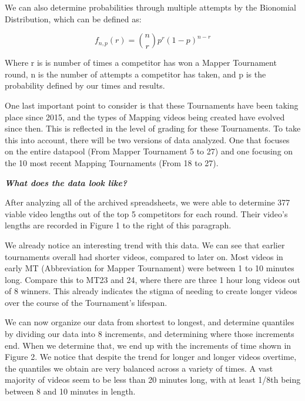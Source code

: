 \documentclass[letterpaper,twocolumn,amsmath,amssymb,prl,nolongbibliography,url,reprint]{revtex4-2}
\begin{document}
We can also determine probabilities through multiple attempts by the Bionomial Distribution, which can be defined as:

\begin{equation}
f_{n,p}(r) = \binom{n}{r} p^r (1-p)^{n-r}
\end{equation}

Where r is is number of times a competitor has won a Mapper Tournament round, n is the number of attempts a competitor has taken, and p is the probability defined by our times and results. 

One last important point to consider is that these Tournaments have been taking place since 2015, and the types of Mapping videos being created have evolved since then. This is reflected in the level of grading for these Tournaments. To take this into account, there will be two versions of data analyzed. One that focuses on the entire datapool (From Mapper Tournament 5 to 27) and one focusing on the 10 most recent Mapping Tournaments (From 18 to 27).

\textbf{\emph{What does the data look like?}}

After analyzing all of the archived spreadsheets, we were able to determine 377 viable video lengths out of the top 5 competitors for each round. Their video's lengths are recorded in Figure 1 to the right of this paragraph.

We already notice an interesting trend with this data. We can see that earlier tournaments overall had shorter videos, compared to later on. Most videos in early MT (Abbreviation for Mapper Tournament) were between 1 to 10 minutes long. Compare this to MT23 and 24, where there are three 1 hour long videos out of 8 winners. This already indicates the stigma of needing to create longer videos over the course of the Tournament's lifespan.

We can now organize our data from shortest to longest, and determine quantiles by dividing our data into 8 increments, and determining where those increments end. When we determine that, we end up with the increments of time shown in Figure 2. We notice that despite the trend for longer and longer videos overtime, the quantiles we obtain are very balanced across a variety of times. A vast majority of videos seem to be less than 20 minutes long, with at least 1/8th being between 8 and 10 minutes in length. 
\end{document}
